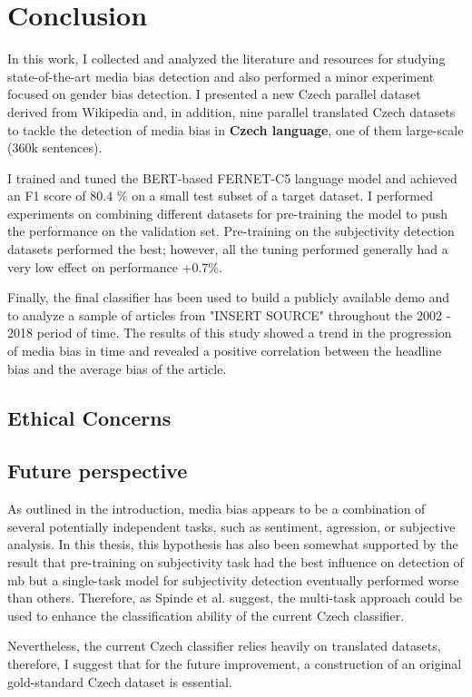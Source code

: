 \chapter{Conclusion}
In this work, I collected and analyzed the literature and resources for studying state-of-the-art media bias detection and also performed a minor experiment focused on gender bias detection. I presented a new Czech parallel dataset derived from Wikipedia and, in addition, nine parallel translated Czech datasets to tackle the detection of media bias in \textbf{Czech language}, one of them large-scale (360k sentences).

I trained and tuned the BERT-based FERNET-C5 language model and achieved an F1 score of 80.4 \% on a small test subset of a target dataset. I performed experiments on combining different datasets for pre-training the model to push the performance on the validation set. Pre-training on the subjectivity detection datasets performed the best; however, all the tuning performed generally had a very low effect on performance +0.7\%. 

Finally, the final classifier has been used to build a publicly available demo and to analyze a sample of articles from "INSERT SOURCE" throughout the 2002 - 2018 period of time. The results of this study showed a trend in the progression of media bias in time and revealed a positive correlation between the headline bias and the average bias of the article.

\section{Ethical Concerns}


\section{Future perspective}
As outlined in the introduction, media bias appears to be a combination of several potentially independent tasks, such as sentiment, agression, or subjective analysis. In this thesis, this hypothesis has also been somewhat supported by the result that pre-training on subjectivity task had the best influence on detection of \gls{mb} but a single-task model for subjectivity detection eventually performed worse than others. Therefore, as Spinde et al. \cite{spindeexploiting} suggest, the multi-task approach could be used to enhance the classification ability of the current Czech classifier.

Nevertheless, the current Czech classifier relies heavily on translated datasets, therefore, I suggest that for the future improvement, a construction of an original gold-standard Czech dataset is essential.
